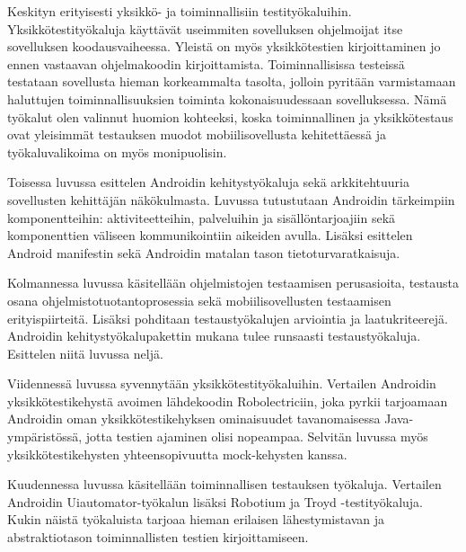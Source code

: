 Keskityn erityisesti yksikkö- ja toiminnallisiin testityökaluihin. Yksikkötestityökaluja käyttävät useimmiten sovelluksen ohjelmoijat itse sovelluksen koodausvaiheessa. Yleistä on myös yksikkötestien kirjoittaminen jo ennen vastaavan ohjelmakoodin kirjoittamista. Toiminnallisissa testeissä testataan sovellusta hieman korkeammalta tasolta, jolloin pyritään varmistamaan haluttujen toiminnallisuuksien toiminta kokonaisuudessaan sovelluksessa. Nämä työkalut olen valinnut huomion kohteeksi, koska toiminnallinen ja yksikkötestaus ovat yleisimmät testauksen muodot mobiilisovellusta kehitettäessä ja työkaluvalikoima on myös monipuolisin.

Toisessa luvussa esittelen Androidin kehitystyökaluja sekä arkkitehtuuria sovellusten kehittäjän näkökulmasta. Luvussa tutustutaan Androidin tärkeimpiin komponentteihin: aktiviteetteihin, palveluihin ja sisällöntarjoajiin sekä komponenttien väliseen kommunikointiin aikeiden avulla. Lisäksi esittelen Android manifestin sekä Androidin matalan tason tietoturvaratkaisuja.

Kolmannessa luvussa käsitellään ohjelmistojen testaamisen perusasioita, testausta osana ohjelmistotuotantoprosessia sekä mobiilisovellusten testaamisen erityispiirteitä. Lisäksi pohditaan testaustyökalujen arviointia ja laatukriteerejä. Androidin kehitystyökalupakettin mukana tulee runsaasti testaustyökaluja. Esittelen niitä luvussa neljä.

Viidennessä luvussa syvennytään yksikkötestityökaluihin. Vertailen Androidin yksikkötestikehystä avoimen lähdekoodin Robolectriciin, joka pyrkii tarjoamaan Androidin oman yksikkötestikehyksen ominaisuudet tavanomaisessa Java-ympäristössä, jotta testien ajaminen olisi nopeampaa. Selvitän luvussa myös yksikkötestikehysten yhteensopivuutta mock-kehysten kanssa.

Kuudennessa luvussa käsitellään toiminnallisen testauksen työkaluja. Vertailen Androidin Uiautomator-työkalun lisäksi Robotium ja Troyd -testityökaluja. Kukin näistä työkaluista tarjoaa hieman erilaisen lähestymistavan ja abstraktiotason toiminnallisten testien kirjoittamiseen.